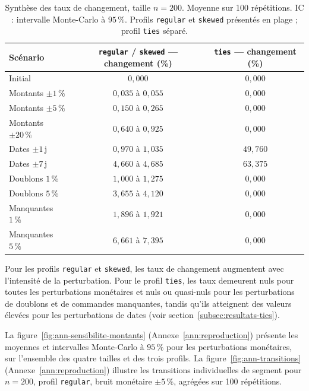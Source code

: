 \begin{table}[htb]
  \centering
  \caption{Synthèse des taux de changement, taille $n = 200$. Moyenne sur 100 répétitions.
    IC : intervalle Monte-Carlo à $95\,\%$. Profils \texttt{regular} et \texttt{skewed}
    présentés en plage ; profil \texttt{ties} séparé.}
  \label{tab:resultats-synthese}
  \small
  \begin{tabular}{lcc}
    \toprule
    Scénario
      & \texttt{regular} / \texttt{skewed} — changement (\%)
      & \texttt{ties} — changement (\%) \\
    \midrule
    Initial
      & $0{,}000$
      & $0{,}000$ \\
    Montants $\pm1\,\%$
      & $0{,}035$ à $0{,}055$
      & $0{,}000$ \\
    Montants $\pm5\,\%$
      & $0{,}150$ à $0{,}265$
      & $0{,}000$ \\
    Montants $\pm20\,\%$
      & $0{,}640$ à $0{,}925$
      & $0{,}000$ \\
    Dates $\pm1$\,j
      & $0{,}970$ à $1{,}035$
      & $49{,}760$ \\
    Dates $\pm7$\,j
      & $4{,}660$ à $4{,}685$
      & $63{,}375$ \\
    Doublons $1\,\%$
      & $1{,}000$ à $1{,}275$
      & $0{,}000$ \\
    Doublons $5\,\%$
      & $3{,}655$ à $4{,}120$
      & $0{,}000$ \\
    Manquantes $1\,\%$
      & $1{,}896$ à $1{,}921$
      & $0{,}000$ \\
    Manquantes $5\,\%$
      & $6{,}661$ à $7{,}395$
      & $0{,}000$ \\
    \bottomrule
  \end{tabular}
\end{table}

Pour les profils \texttt{regular} et \texttt{skewed}, les taux de changement augmentent avec
l'intensité de la perturbation. Pour le profil \texttt{ties}, les taux demeurent nuls pour
toutes les perturbations monétaires et nuls ou quasi-nuls pour les perturbations de doublons
et de commandes manquantes, tandis qu'ils atteignent des valeurs élevées pour les perturbations
de dates (voir section~\ref{subsec:resultats-ties}).

La figure~\ref{fig:ann-sensibilite-montants} (Annexe~\ref{ann:reproduction}) présente les
moyennes et intervalles Monte-Carlo à $95\,\%$ pour les perturbations monétaires, sur
l'ensemble des quatre tailles et des trois profils. La figure~\ref{fig:ann-transitions}
(Annexe~\ref{ann:reproduction}) illustre les transitions individuelles de segment pour
$n = 200$, profil \texttt{regular}, bruit monétaire $\pm5\,\%$, agrégées sur 100 répétitions.

